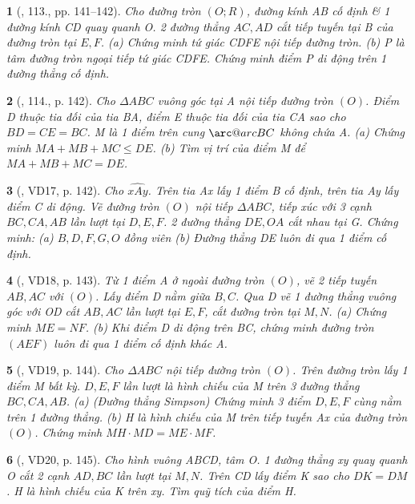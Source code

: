 \documentclass{article}
\makeatletter
\newcommand{\arc@char}{{\usefont{U}{tipa}{m}{n}\symbol{62}}}%
\newcommand{\arc}[1]{\mathpalette\arc@arc{#1}}
\newcommand{\arc@arc}[2]{%
	\sbox0{$\m@th#1#2$}%
	\vbox{
		\hbox{\resizebox{\wd0}{\height}{\arc@char}}
		\nointerlineskip
		\box0
	}%
}
\newtheorem{baitoan}{}
\makeatother
\begin{document}
\begin{baitoan}[\cite{Tuyen_Toan_9_old}, 113., pp. 141--142]
	Cho đường tròn $(O;R)$, đường kính AB cố định \& 1 đường kính CD quay quanh O. 2 đường thẳng $AC,AD$ cắt tiếp tuyến tại B của đường tròn tại $E,F$. (a) Chứng minh tứ giác CDFE nội tiếp đường tròn. (b) P là tâm đường tròn ngoại tiếp tứ giác CDFE. Chứng minh điểm P di động trên 1 đường thẳng cố định.
\end{baitoan}

\begin{baitoan}[\cite{Tuyen_Toan_9_old}, 114., p. 142]
	Cho $\Delta ABC$ vuông góc tại A nội tiếp đường tròn $(O)$. Điểm D thuộc tia đối của tia BA, điểm E thuộc tia đối của tia CA sao cho $BD = CE = BC$. M là 1 điểm trên cung $\arc{BC}$ không chứa A. (a) Chứng minh $MA + MB + MC\le DE$. (b) Tìm vị trí của điểm M để $MA + MB + MC = DE$.
\end{baitoan}

\begin{baitoan}[\cite{Tuyen_Toan_9_old}, VD17, p. 142]
	Cho $\widehat{xAy}$. Trên tia Ax lấy 1 điểm B cố định, trên tia Ay lấy điểm C di động. Vẽ đường tròn $(O)$ nội tiếp $\Delta ABC$, tiếp xúc với 3 cạnh $BC,CA,AB$ lần lượt tại $D,E,F$. 2 đường thẳng $DE,OA$ cắt nhau tại G. Chứng minh: (a) $B,D,F,G,O$ đồng viên (b) Đường thẳng DE luôn đi qua 1 điểm cố định.
\end{baitoan}

\begin{baitoan}[\cite{Tuyen_Toan_9_old}, VD18, p. 143]
	Từ 1 điểm A ở ngoài đường tròn $(O)$, vẽ 2 tiếp tuyến $AB,AC$ với $(O)$. Lấy điểm D nằm giữa $B,C$. Qua D vẽ 1 đường thẳng vuông góc với OD cắt $AB,AC$ lần lượt tại $E,F$, cắt đường tròn tại $M,N$. (a) Chứng minh $ME = NF$. (b) Khi điểm D di động trên BC, chứng minh đường tròn $(AEF)$ luôn đi qua 1 điểm cố định khác A.
\end{baitoan}

\begin{baitoan}[\cite{Tuyen_Toan_9_old}, VD19, p. 144]
	Cho $\Delta ABC$ nội tiếp đường tròn $(O)$. Trên đường tròn lấy 1 điểm M bất kỳ. $D,E,F$ lần lượt là hình chiếu của M trên 3 đường thẳng $BC,CA,AB$. (a) {\rm(Đường thẳng Simpson)} Chứng minh 3 điểm $D,E,F$ cùng nằm trên 1 đường thẳng. (b) H là hình chiếu của M trên tiếp tuyến Ax của đường tròn $(O)$. Chứng minh $MH\cdot MD = ME\cdot MF$.
\end{baitoan}

\begin{baitoan}[\cite{Tuyen_Toan_9_old}, VD20, p. 145]
	Cho hình vuông ABCD, tâm O. 1 đường thẳng xy quay quanh O cắt 2 cạnh $AD,BC$ lần lượt tại $M,N$. Trên CD lấy điểm K sao cho $DK = DM$. H là hình chiếu của K trên xy. Tìm quỹ tích của điểm H.
\end{baitoan}
\end{document}
